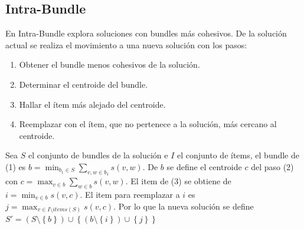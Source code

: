\subsection{Intra-Bundle}
En Intra-Bundle explora soluciones con bundles más cohesivos. De la solución actual se realiza el movimiento a una nueva solución con los pasos:
\begin{enumerate}
	\item Obtener el bundle menos cohesivos de la solución.
	\item Determinar el centroide del bundle.
	\item Hallar el ítem más alejado del centroide.
	\item Reemplazar con el ítem, que no pertenece a la solución, más cercano al centroide.
\end{enumerate}

Sea $S$ el conjunto de bundles de la solución e $I$ el conjunto de ítems, el bundle de (1) es $b = \min_{b_1 \in S}{\sum_{v,w \in b_1}{s(v,w)}}$. De $b$ se define el centroide $c$ del paso (2) con $c = \max_{v \in b}{\sum_{w \in b}{s(v,w)}}$. El item de (3) se obtiene de $i = \min_{v \in b}{s(v,c)}$. El item para reemplazar a $i$ es $j = \max_{v \in I \setminus items(S)}{s(v,c)}$. Por lo que la nueva solución se define $S' = (S \setminus \left\{b\right\}) \cup \left\{(b \setminus \left\{i\right\})\cup\left\{j\right\}\right\}$

